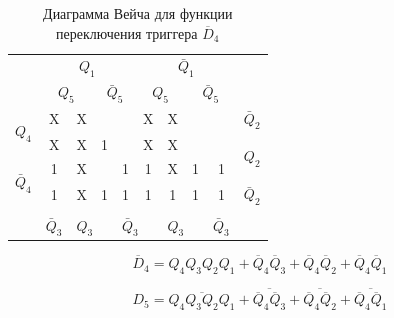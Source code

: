 \documentclass[a4paper,14pt]{article}
\begin{document}
\begin{table}[H]
	\begin{center}
		\caption{\label{tab:unD4_tab} Диаграмма Вейча для функции переключения триггера $\overline{D}_4$ }
		\begin{tabular}{cccccccccc}
			& \multicolumn{4}{c}{$Q_1$} & \multicolumn{4}{c}{$\bar{Q}_1$} &  \\
			& \multicolumn{2}{c}{$Q_5$} & \multicolumn{2}{c}{$\bar{Q}_5$} & \multicolumn{2}{c}{$Q_5$} & \multicolumn{2}{c}{$\bar{Q}_5$} &  \\ \cline{2-9}
			\multicolumn{1}{c|}{\multirow{2}{*}{$Q_4$}} & \multicolumn{1}{c|}{X} & \multicolumn{1}{c|}{X} & \multicolumn{1}{c|}{} & \multicolumn{1}{c|}{} & \multicolumn{1}{c|}{X} & \multicolumn{1}{c|}{X} & \multicolumn{1}{c|}{} & \multicolumn{1}{c|}{} & $\bar{Q}_2$ \\ \cline{2-9}
			\multicolumn{1}{c|}{} & \multicolumn{1}{c|}{X} & \multicolumn{1}{c|}{X} & \multicolumn{1}{c|}{1} & \multicolumn{1}{c|}{} & \multicolumn{1}{c|}{X} & \multicolumn{1}{c|}{X} & \multicolumn{1}{c|}{} & \multicolumn{1}{c|}{} & \multirow{2}{*}{$Q_2$} \\ \cline{2-9}
			\multicolumn{1}{c|}{\multirow{2}{*}{$\bar{Q}_4$}} & \multicolumn{1}{c|}{1} & \multicolumn{1}{c|}{X} & \multicolumn{1}{c|}{} & \multicolumn{1}{c|}{1} & \multicolumn{1}{c|}{1} & \multicolumn{1}{c|}{X} & \multicolumn{1}{c|}{1} & \multicolumn{1}{c|}{1} &  \\ \cline{2-9}
			\multicolumn{1}{c|}{} & \multicolumn{1}{c|}{1} & \multicolumn{1}{c|}{X} & \multicolumn{1}{c|}{1} & \multicolumn{1}{c|}{1} & \multicolumn{1}{c|}{1} & \multicolumn{1}{c|}{1} & \multicolumn{1}{c|}{1} & \multicolumn{1}{c|}{1} & $\bar{Q}_2$ \\ \cline{2-9}
			&  & \multicolumn{2}{c}{} & \multicolumn{2}{c}{} & \multicolumn{2}{c}{} &  &  \\
			\multicolumn{1}{l}{} & \multicolumn{1}{l}{$\bar{Q}_3$} & \multicolumn{2}{l}{$Q_3$} & \multicolumn{2}{l}{$\bar{Q}_3$} & \multicolumn{2}{l}{$Q_3$} & \multicolumn{1}{l}{$\bar{Q}_3$} & \multicolumn{1}{l}{}
		\end{tabular}
	\end{center}
\end{table}

$$\overline{D}_4 = Q_4Q_3Q_2Q_1 + \overline{Q}_4\overline{Q}_3 + \overline{Q}_4\overline{Q}_2 + \overline{Q}_4\overline{Q}_1$$

$$D_5 = \overline{Q_4Q_3Q_2Q_1} + \overline{\overline{Q}_4\overline{Q}_3} + \overline{\overline{Q}_4\overline{Q}_2} + \overline{\overline{Q}_4\overline{Q}_1}$$
\end{document}
